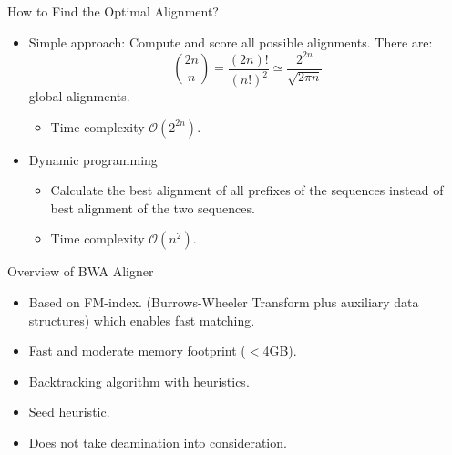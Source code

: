 \documentclass{beamer}
\begin{document}

\begin{frame}{ How to Find the Optimal Alignment? }

\begin{itemize}
	\item Simple approach: Compute and score all possible
	alignments.
	\vskip 0.35cm
	There are:
		$$ \binom{2n}{n} = \frac{(2n)!}{(n!)^2} \simeq \frac{2^{2n}}{\sqrt{2\pi n}} $$
		\vskip 0.2cm
		global alignments.
	\begin{itemize}	 
		\item Time complexity $\mathcal{O}(2^{2n})$.
	\end{itemize}	
	\vskip 0.25cm		
	\item Dynamic programming
		\begin{itemize}
			\item Calculate the best alignment of all prefixes of the sequences instead of best alignment of the two sequences.
			\item  Time complexity $\mathcal{O}(n^{2})$.
		\end{itemize}
\end{itemize}

\end{frame}


\begin{frame}{ Overview of BWA Aligner}
	\begin{itemize}
		\item Based on FM-index.
		(Burrows-Wheeler Transform plus auxiliary data structures)
		which enables fast matching. 
     	\item Fast and moderate memory footprint ($<$4GB).
		\item Backtracking algorithm with heuristics.
		\item Seed heuristic.
		\item Does not take deamination into consideration.
	\end{itemize}
\end{frame}
\end{document}
